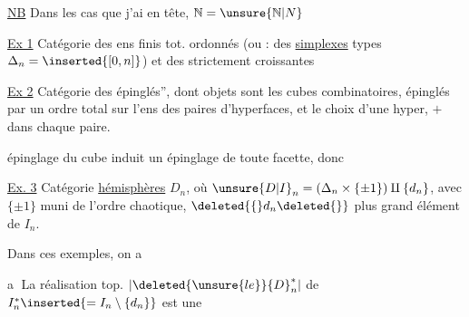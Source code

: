 \uline{NB} Dans les cas que j'ai en tête, $\mathbb N=\unsure{\mathbb N|N}$

\uline{Ex 1} Catégorie des ens finis tot. ordonnés (ou : des \uline{simplexes} types $\Delta_n=\inserted{[0,n]}$) et des  strictement croissantes

\uline{Ex 2} Catégorie des   épinglés'',  dont  objets sont les  cubes combinatoires,
  épinglés par un ordre total sur l'ens des paires d'hyperfaces,  et le choix d'une hyper,   $+$ dans chaque paire.

 épinglage du cube induit un épinglage de toute facette, donc  

\uline{Ex. 3} Catégorie   \uline{hémisphères} $D_n$, où $ {\unsure{D|I}}_n=(\Delta_n\times\{\pm1\})\amalg\{d_n\}$, avec $\{\pm1\}$ muni de l'ordre chaotique, $\deleted{\{}d_n\deleted{\}}$  plus grand élément de $I_n$.

Dans  ces  exemples, on a

\textcircled{a}  La réalisation top. $|\deleted{\unsure{le}} {D}_n^*|$ de $I_n^*\inserted{=I_n\setminus\{d_n\}}$ est une 


